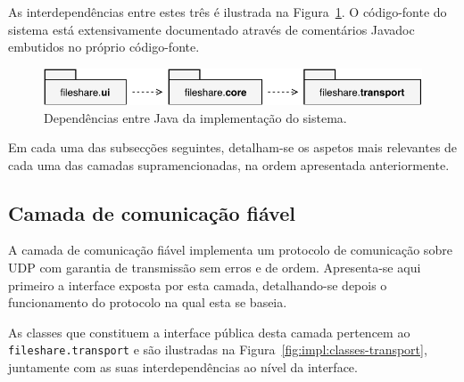 As interdependências entre estes três  é ilustrada na Figura~\ref{fig:impl:packages}. O código-fonte do sistema está extensivamente documentado através de comentários Javadoc embutidos no próprio código-fonte.

\begin{figure}[ht]
  \centering
  \vspace*{.3\baselineskip}
  \includegraphics[scale=.9]{figures/packages.pdf}
  \caption{Dependências entre  Java da implementação do sistema.}
  \label{fig:impl:packages}
  \vspace*{.1\baselineskip}
\end{figure}

Em cada uma das subsecções seguintes, detalham-se os aspetos mais relevantes de cada uma das camadas supramencionadas, na ordem apresentada anteriormente.


\subsection{Camada de comunicação fiável}

A camada de comunicação fiável implementa um protocolo de comunicação sobre UDP com garantia de transmissão sem erros e de ordem. Apresenta-se aqui primeiro a interface exposta por esta camada, detalhando-se depois o funcionamento do protocolo na qual esta se baseia.


As classes que constituem a interface pública desta camada pertencem ao  \texttt{fileshare.transport} e são ilustradas na Figura~\ref{fig:impl:classes-transport}, juntamente com as suas interdependências ao nível da interface.

